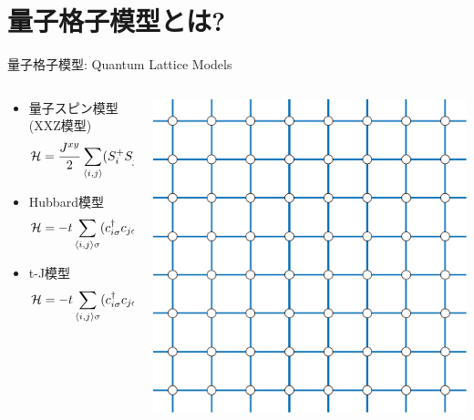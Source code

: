 \section{量子格子模型とは?}
\begin{frame}{量子格子模型: Quantum Lattice Models}
  \begin{columns}[T]
    \begin{column}{.8\textwidth}
      \begin{itemize}
      \item 量子スピン模型(XXZ模型) \begin{equation*} {\cal H} = \frac{J^{xy}}{2}
        \sum_{\langle i,j \rangle} (S^+_i S^-_j + S^-_i S^+_j) + J^z
        \sum_{\langle i,j \rangle} S^z_i S^z_j \end{equation*}
      \item Hubbard模型 \begin{equation*} {\cal H} = -t \sum_{\langle i,j \rangle \sigma}
        (c^\dagger_{i\sigma} c_{j\sigma} + \mbox{h.c.}) + U \sum_{i}
        n_{i\uparrow} n_{i\downarrow} \end{equation*}
      \item t-J模型 \begin{equation*} {\cal H} = -t \sum_{\langle i,j \rangle \sigma}
        (c^\dagger_{i\sigma} c_{j\sigma} + \mbox{h.c.}) + J \sum_{i,j}
        ({\bf S}_i \cdot {\bf S}_j - n_{i} n_{j} / 4) \end{equation*}
      \end{itemize}
    \end{column}
    \begin{column}{.2\textwidth}
      \includegraphics[width=\textwidth]{square.pdf}
    \end{column}
  \end{columns}
\end{frame}

